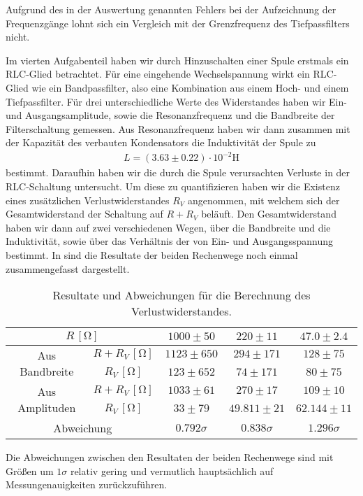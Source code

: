 Aufgrund des in der Auswertung genannten Fehlers bei der Aufzeichnung der Frequenzgänge lohnt sich ein Vergleich mit der Grenzfrequenz des Tiefpassfilters nicht.

Im vierten Aufgabenteil haben wir durch Hinzuschalten einer Spule erstmals ein RLC-Glied betrachtet. Für eine eingehende Wechselspannung wirkt ein RLC-Glied wie ein Bandpassfilter, also eine Kombination aus einem Hoch- und einem Tiefpassfilter. Für drei unterschiedliche Werte des Widerstandes haben wir Ein- und Ausgangsamplitude, sowie die Resonanzfrequenz und die Bandbreite der Filterschaltung gemessen. Aus Resonanzfrequenz haben wir dann zusammen mit der Kapazität des verbauten Kondensators die Induktivität der Spule zu
\begin{align*}
  L = (3.63 \pm 0.22) \cdot 10^{-2}\si{\henry}
\end{align*}
bestimmt. Daraufhin haben wir die durch die Spule verursachten Verluste in der RLC-Schaltung untersucht. Um diese zu quantifizieren haben wir die Existenz eines zusätzlichen Verlustwiderstandes $R_V$ angenommen, mit welchem sich der Gesamtwiderstand der Schaltung auf $R + R_V$ beläuft. Den Gesamtwiderstand haben wir dann auf zwei verschiedenen Wegen, über die Bandbreite und die Induktivität, sowie über das Verhältnis der von Ein- und Ausgangsspannung bestimmt. In  sind die Resultate der beiden Rechenwege noch einmal zusammengefasst dargestellt.

\renewcommand{\arraystretch}{1.5}
\begin{table}[H]
  \centering
  \caption{Resultate und Abweichungen für die Berechnung des Verlustwiderstandes.}
  \vspace*{1em}
  \begin{tabular}{|c|c|c|c|c|}
    \hline
    \multicolumn{2}{|c|}{$R\,[\si{\ohm}]$} & $1000 \pm 50$ & $220 \pm 11$ & $47.0 \pm 2.4$ \\
    \hline
    \hline
    \multirow{2}{*}{Aus Bandbreite} & $R + R_V\,[\si{\ohm}]$ & $1123 \pm 650$ & $294 \pm 171$ & $128 \pm 75$ \\
    \cline{2-5}
    & $R_V\,[\si{\ohm}]$ & $123 \pm 652$ & $74 \pm 171$ & $80 \pm 75$ \\
    \hline
    \hline
    \multirow{2}{*}{Aus Amplituden} & $R + R_V\,[\si{\ohm}]$  & $1033 \pm 61$ & $270 \pm 17$ & $109 \pm 10$ \\
    \cline{2-5}
    & $R_V\,[\si{\ohm}]$ & $33 \pm 79$ & $49.811 \pm 21$ & $62.144 \pm 11$ \\
    \hline\hline
    \multicolumn{2}{|c|}{Abweichung} & $0.792\sigma$ & $0.838\sigma$ & $1.296\sigma$ \\\hline
  \end{tabular}
  \label{tab:zsmf_verlustwiderstand}
\end{table}
\renewcommand{\arraystretch}{1}

Die Abweichungen zwischen den Resultaten der beiden Rechenwege sind mit Größen um $1\sigma$ relativ gering und vermutlich hauptsächlich auf Messungenauigkeiten zurückzuführen. 